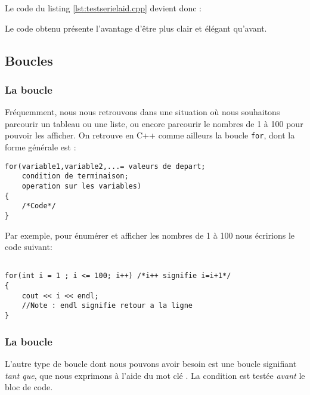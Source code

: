 Le code du listing \ref{lst:testserielaid.cpp} devient donc :\\



Le code obtenu pr\'esente l'avantage d'\^etre plus clair et \'el\'egant qu'avant.

\subsection{Boucles}

\subsubsection{La boucle }

Fr\'equemment, nous nous retrouvons dans une situation o\`u
nous souhaitons parcourir un tableau ou une liste, ou encore parcourir le
nombres de 1 \`a 100 pour pouvoir les afficher.  On retrouve en C++ comme ailleurs la boucle \verb+for+, dont la forme g\'en\'erale est :\\

\begin{DDbox}{\linewidth}
\begin{lstlisting}[caption=Syntaxe d'une boucle \texttt{for}]
for(variable1,variable2,...= valeurs de depart;
    condition de terminaison;
    operation sur les variables)
{
    /*Code*/
}

\end{lstlisting}
\end{DDbox}

Par exemple, pour \'enum\'erer et afficher les nombres de 1 \`a 100 nous \'ecririons le code suivant:\\

\begin{DDbox}{\linewidth}
\begin{lstlisting}[caption=Exemple de boucle \texttt{for}]

for(int i = 1 ; i <= 100; i++) /*i++ signifie i=i+1*/
{
    cout << i << endl;
    //Note : endl signifie retour a la ligne
}
\end{lstlisting}
\end{DDbox}

\subsubsection{La boucle }

L'autre type de boucle dont nous pouvons avoir besoin est une boucle signifiant \textit{tant que}, que nous exprimons \`a l'aide du mot cl\'e . La condition est test\'ee \emph{avant} le bloc de code.\\

